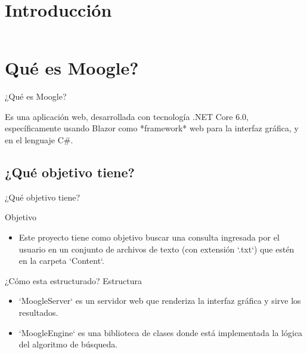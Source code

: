 \section{Introducción}\label{intro}

\begin{frame}
    \begin{columns}[t]
        \begin{column}{.5\textwidth}
          \tableofcontents[sections={1-2},currentsection]
        \end{column}
        \begin{column}{.5\textwidth}
          \tableofcontents[sections={3-4},currentsection]
        \end{column}
    \end{columns}
\end{frame}


\section{Qué es Moogle?}
\begin{frame}{¿Qué es Moogle?}
\begin{center}
    Es una aplicación web, desarrollada con tecnología .NET Core 6.0, 
    específicamente usando Blazor como *framework* web para la interfaz gráfica, 
    y en el lenguaje C#.     
\end{center}

\end{frame}
\subsection{¿Qué objetivo tiene?}
\begin{frame}{¿Qué objetivo tiene?}

    Objetivo
\begin{itemize}
  \item Este proyecto tiene como objetivo buscar una consulta ingresada por el usuario 
  en un conjunto de archivos de texto (con extensión `.txt`) que estén en la 
  carpeta `Content`.   
 
\end{itemize}
\end{frame}
\begin{frame}{¿Cómo esta estructurado?}
    Estructura
\begin{itemize}
  \item `MoogleServer` es un servidor web que renderiza la interfaz gráfica y sirve los 
  resultados. 
  \item `MoogleEngine` es una biblioteca de clases donde está implementada la 
  lógica del algoritmo de búsqueda. 
  
 
\end{itemize}
\end{frame}

